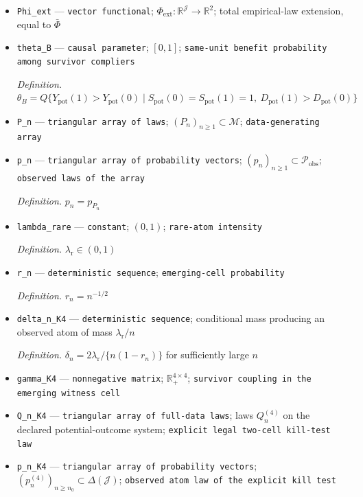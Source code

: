\documentclass{article}
\begin{document}
\begin{itemize}
  \item \texttt{Phi\_\allowbreak{}ext} --- \texttt{vector functional}; \(\Phi_{\mathrm{ext}}:\mathbb R^{\mathcal J}\to\mathbb R^2\); total empirical-law extension, equal to \(\bar\Phi\)
  \item \texttt{theta\_\allowbreak{}B} --- \texttt{causal parameter}; \([0,1]\); \texttt{same-\allowbreak{}unit benefit probability among survivor compliers}
  \par\smallskip\noindent\emph{Definition.} \(\theta_B=Q\{Y_{\mathrm{pot}}(1)>Y_{\mathrm{pot}}(0)\mid S_{\mathrm{pot}}(0)=S_{\mathrm{pot}}(1)=1,\ D_{\mathrm{pot}}(1)>D_{\mathrm{pot}}(0)\}\)
  \item \texttt{P\_\allowbreak{}n} --- \texttt{triangular array of laws}; \((P_n)_{n\ge1}\subset\mathcal M\); \texttt{data-\allowbreak{}generating array}
  \item \texttt{p\_\allowbreak{}n} --- \texttt{triangular array of probability vectors}; \((p_n)_{n\ge1}\subset\mathcal P_{\mathrm{obs}}\); \texttt{observed laws of the array}
  \par\smallskip\noindent\emph{Definition.} \(p_n=p_{P_n}\)
  \item \texttt{lambda\_\allowbreak{}rare} --- \texttt{constant}; \((0,1)\); \texttt{rare-\allowbreak{}atom intensity}
  \par\smallskip\noindent\emph{Definition.} \(\lambda_{\mathrm r}\in(0,1)\)
  \item \texttt{r\_\allowbreak{}n} --- \texttt{deterministic sequence}; \texttt{emerging-\allowbreak{}cell probability}
  \par\smallskip\noindent\emph{Definition.} \(r_n=n^{-1/2}\)
  \item \texttt{delta\_\allowbreak{}n\_\allowbreak{}K4} --- \texttt{deterministic sequence}; conditional mass producing an observed atom of mass \(\lambda_{\mathrm r}/n\)
  \par\smallskip\noindent\emph{Definition.} \(\delta_n=2\lambda_{\mathrm r}/\{n(1-r_n)\}\) for sufficiently large \(n\)
  \item \texttt{gamma\_\allowbreak{}K4} --- \texttt{nonnegative matrix}; \(\mathbb R_+^{4\times4}\); \texttt{survivor coupling in the emerging witness cell}
  \item \texttt{Q\_\allowbreak{}n\_\allowbreak{}K4} --- \texttt{triangular array of full-\allowbreak{}data laws}; laws \(Q_n^{(4)}\) on the declared potential-outcome system; \texttt{explicit legal two-\allowbreak{}cell kill-\allowbreak{}test law}
  \item \texttt{p\_\allowbreak{}n\_\allowbreak{}K4} --- \texttt{triangular array of probability vectors}; \((p_n^{(4)})_{n\ge n_0}\subset\Delta(\mathcal J)\); \texttt{observed atom law of the explicit kill test}

\end{itemize}
\end{document}
